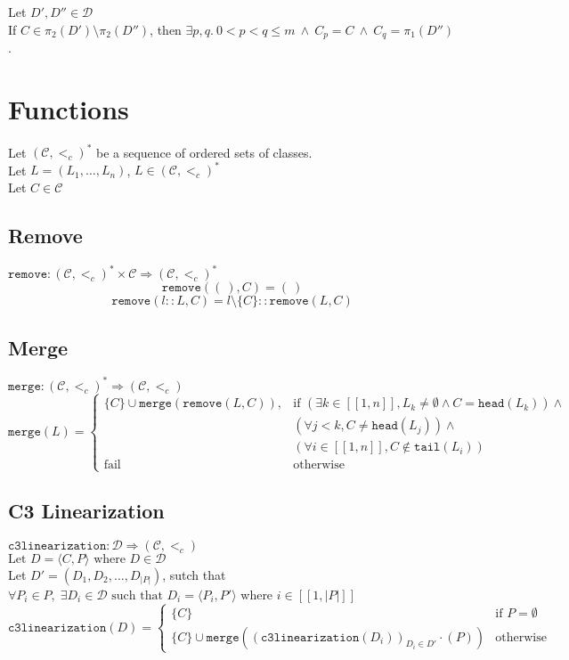 \documentclass{article}
\newcommand*{\CC}{\ensuremath{\mathcal{C}}\xspace}
\newcommand*{\DD}{\ensuremath{\mathcal{D}}\xspace}
\newcommand*{\ordCC}{\ensuremath{(\mathcal{C}, <_c)}\xspace}
\newcommand*{\cl}{\texttt{c3linearization}}
\newcommand*{\rem}{\texttt{remove}}
\newcommand*{\h}{\texttt{head}}
\newcommand*{\mer}{\texttt{merge}}
\newcommand*{\oneToN}{\ensuremath{[\![1,n]\!]}\xspace}
\begin{document}
Let $D', D'' \in \DD$ \\
If $C \in \pi_2(D') \setminus \pi_2(D'')$, then $\exists p,q. \ 0 < p < q \leq m \ \wedge \ C_p = C \ \wedge \ C_q = \pi_1(D'')$.
\vspace{2cm}

\section*{Functions}

Let $\ordCC^*$ be a sequence of ordered sets of classes.\\
Let $L = (L_1, \ldots , L_n)$, $L \in \ordCC^*$\\
Let $C \in \mathcal{C}$\\

\subsection*{Remove}

$\rem : \ordCC^* \times \CC \Rightarrow \ordCC^*$\\
\[
\rem(( \ ), C) = ( \ )
\]
\[
\rem(l::L, C) = l \setminus \{C\} :: \rem(L,C)
\]

\subsection*{Merge}
$\mer : \ordCC^* \Rightarrow \ordCC $ \\


\[
\mer(L) =
\begin{cases}
\{C\} \cup \mer(\rem(L, C)), & \text{if } (\exists k \in \oneToN, L_k \neq \emptyset \land C = \h(L_k)) \land \\
& (\forall j < k, C \neq \h(L_j)) \land \\ 
& (\forall i \in \oneToN,C \notin \texttt{tail}(L_i)) \\ 

\text{fail}  & \text{otherwise}
\end{cases}
\]

\subsection*{C3 Linearization}
$\cl: \DD \Rightarrow \ordCC$\\
$\text{Let } D = \langle C, P \rangle \text{ where } D \in \DD$\\
Let $D' = (D_1,D_2, \dots ,D_{|P|})$, sutch that \\ %
$\forall P_i \in P, \; \exists D_i \in \DD \text{ such that } D_i = \langle P_i, P' \rangle$ where $i \in  [\![1, |P|]\!]$\\

\[
\cl(D) =
\begin{cases}
\{C\} & \text{if } P = \emptyset \\
\{C\} \cup \mer\left( (\cl(D_i))_{D_i \in D'} \cdot (P) \right) & \text{otherwise}
\end{cases}
\]
\end{document}
